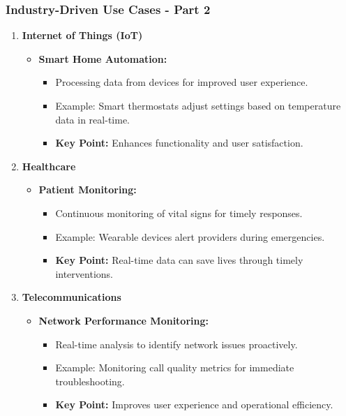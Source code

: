 \documentclass[aspectratio=169]{beamer}
\begin{document}
\begin{frame}[fragile]
    \frametitle{Industry-Driven Use Cases - Part 2}
    \begin{enumerate}[resume]
        \item \textbf{Internet of Things (IoT)}
            \begin{itemize}
                \item \textbf{Smart Home Automation:}
                \begin{itemize}
                    \item Processing data from devices for improved user experience.
                    \item Example: Smart thermostats adjust settings based on temperature data in real-time.
                    \item \textbf{Key Point:} Enhances functionality and user satisfaction.
                \end{itemize}
            \end{itemize}
        
        \item \textbf{Healthcare}
            \begin{itemize}
                \item \textbf{Patient Monitoring:}
                \begin{itemize}
                    \item Continuous monitoring of vital signs for timely responses.
                    \item Example: Wearable devices alert providers during emergencies.
                    \item \textbf{Key Point:} Real-time data can save lives through timely interventions.
                \end{itemize}
            \end{itemize}

        \item \textbf{Telecommunications}
            \begin{itemize}
                \item \textbf{Network Performance Monitoring:}
                \begin{itemize}
                    \item Real-time analysis to identify network issues proactively.
                    \item Example: Monitoring call quality metrics for immediate troubleshooting.
                    \item \textbf{Key Point:} Improves user experience and operational efficiency.
                \end{itemize}
            \end{itemize}
    \end{enumerate}
\end{frame}
\end{document}
